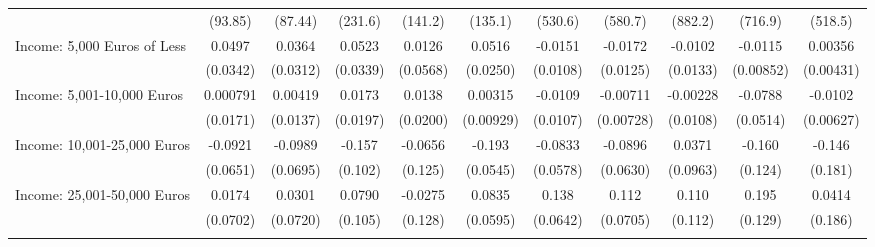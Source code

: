 {\begin{tabular}{l*{10}{c}}
            &     (93.85)         &     (87.44)         &     (231.6)         &     (141.2)         &     (135.1)         &     (530.6)         &     (580.7)         &     (882.2)         &     (716.9)         &     (518.5)         \\
\addlinespace
Income: 5,000 Euros of Less&      0.0497         &      0.0364         &      0.0523         &      0.0126         &      0.0516\sym{*}  &     -0.0151         &     -0.0172         &     -0.0102         &     -0.0115         &     0.00356         \\
            &    (0.0342)         &    (0.0312)         &    (0.0339)         &    (0.0568)         &    (0.0250)         &    (0.0108)         &    (0.0125)         &    (0.0133)         &   (0.00852)         &   (0.00431)         \\
\addlinespace
Income: 5,001-10,000 Euros&    0.000791         &     0.00419         &      0.0173         &      0.0138         &     0.00315         &     -0.0109         &    -0.00711         &    -0.00228         &     -0.0788         &     -0.0102         \\
            &    (0.0171)         &    (0.0137)         &    (0.0197)         &    (0.0200)         &   (0.00929)         &    (0.0107)         &   (0.00728)         &    (0.0108)         &    (0.0514)         &   (0.00627)         \\
\addlinespace
Income: 10,001-25,000 Euros&     -0.0921         &     -0.0989         &      -0.157         &     -0.0656         &      -0.193\sym{***}&     -0.0833         &     -0.0896         &      0.0371         &      -0.160         &      -0.146         \\
            &    (0.0651)         &    (0.0695)         &     (0.102)         &     (0.125)         &    (0.0545)         &    (0.0578)         &    (0.0630)         &    (0.0963)         &     (0.124)         &     (0.181)         \\
\addlinespace
Income: 25,001-50,000 Euros&      0.0174         &      0.0301         &      0.0790         &     -0.0275         &      0.0835         &       0.138\sym{*}  &       0.112         &       0.110         &       0.195         &      0.0414         \\
            &    (0.0702)         &    (0.0720)         &     (0.105)         &     (0.128)         &    (0.0595)         &    (0.0642)         &    (0.0705)         &     (0.112)         &     (0.129)         &     (0.186)         \\
\addlinespace

\end{tabular}}

